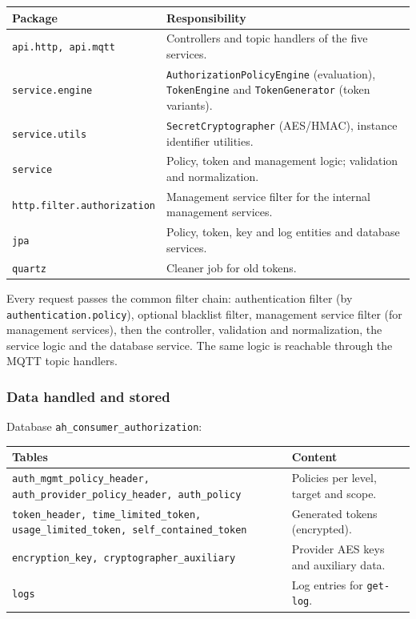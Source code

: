 \documentclass[a4paper]{arrowhead}
\begin{document}
\noindent\begin{longtable}{| p{5.6cm} | p{9.6cm} |} \hline
\rowcolor{gray!33} Package & Responsibility \\ \hline \endhead
\texttt{api.\allowbreak{}http,\allowbreak{} api.\allowbreak{}mqtt} & Controllers and topic handlers of the five services. \\ \hline
\texttt{service.\allowbreak{}engine} & \texttt{Authorization\allowbreak{}Policy\allowbreak{}Engine} (evaluation), \texttt{TokenEngine} and \texttt{TokenGenerator} (token variants). \\ \hline
\texttt{service.\allowbreak{}utils} & \texttt{Secret\allowbreak{}Cryptographer} (AES/HMAC), instance identifier utilities. \\ \hline
\texttt{service} & Policy, token and management logic; validation and normalization. \\ \hline
\texttt{http.\allowbreak{}filter.\allowbreak{}authorization} & Management service filter for the internal management services. \\ \hline
\texttt{jpa} & Policy, token, key and log entities and database services. \\ \hline
\texttt{quartz} & Cleaner job for old tokens. \\ \hline
\end{longtable}

Every request passes the common filter chain: authentication filter (by \texttt{authentication.policy}), optional blacklist filter, management service filter (for management services), then the controller, validation and normalization, the service logic and the database service. The same logic is reachable through the MQTT topic handlers.

\subsubsection{Data handled and stored}

Database \texttt{ah\_consumer\_authorization}:

\noindent\begin{longtable}{| p{6.4cm} | p{8.8cm} |} \hline
\rowcolor{gray!33} Tables & Content \\ \hline \endhead
\texttt{auth\_\allowbreak{}mgmt\_\allowbreak{}policy\_\allowbreak{}header,\allowbreak{} auth\_\allowbreak{}provider\_\allowbreak{}policy\_\allowbreak{}header,\allowbreak{} auth\_\allowbreak{}policy} & Policies per level, target and scope. \\ \hline
\texttt{token\_\allowbreak{}header,\allowbreak{} time\_\allowbreak{}limited\_\allowbreak{}token,\allowbreak{} usage\_\allowbreak{}limited\_\allowbreak{}token,\allowbreak{} self\_\allowbreak{}contained\_\allowbreak{}token} & Generated tokens (encrypted). \\ \hline
\texttt{encryption\_\allowbreak{}key,\allowbreak{} cryptographer\_\allowbreak{}auxiliary} & Provider AES keys and auxiliary data. \\ \hline
\texttt{logs} & Log entries for \texttt{get-\allowbreak{}log}. \\ \hline
\end{longtable}
\end{document}
